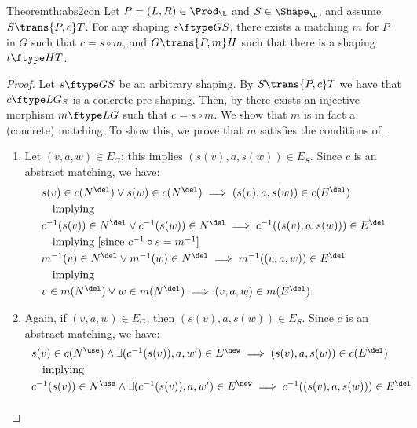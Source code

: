 \begin{oldresult}{Theorem}{th:abs2con}
  Let $P=(L,R)\in \Prod_\L$ and $S\in \Shape_\L$, and assume $S\trans{P,c} T$.
  For any shaping $s\ftype G S$, there exists a matching $m$ for $P$ in $G$ such
  that $c=s\circ m$, and $G\trans{P,m} H$ such that there is a shaping $t\ftype
  H T$.
\end{oldresult}
%
\begin{proof}
  Let $s\ftype G S$ be an arbitrary shaping.  By $S\trans{P,c}T$ we have that
  $c \ftype L {G_S}$ is a concrete pre-shaping.  Then, by  there exists an injective morphism $m \ftype L G$ such that
  $c=s \circ m$. We show that $m$ is in fact a (concrete) matching.
To show this, we  prove  that $m$ 
satisfies the conditions of .
\begin{enumerate}
\item 
Let $(v,a,w) \in E_G$; this implies $(s(v),a,s(w)) \in E_S$. Since $c$
  is an abstract matching, we have:
\[\begin{array}{l}
s(v) \in c(N^\del) \vee s(w) \in c(N^\del) \implies (s(v),a,s(w)) \in
c(E^\del)
\\[\smallskipamount]
\quad\mbox{implying}
\\[\smallskipamount]
c^{-1}(s(v)) \in N^\del \vee c^{-1}(s(w)) \in N^\del \implies c^{-1}((s(v),a,s(w))) \in
E^\del 
\\[\smallskipamount]
\quad\mbox{implying [since $c^{-1}\circ s=m^{-1}$]}
\\[\smallskipamount]
m^{-1}(v) \in N^\del \vee m^{-1}(w) \in N^\del \implies m^{-1}((v,a,w)) \in E^\del 
\\[\smallskipamount]
\quad\mbox{implying}
\\[\smallskipamount]
v \in m(N^\del) \vee w \in m(N^\del) \implies (v,a,w) \in m(E^\del). 
\end{array}\] 
%
\item Again, if  $(v,a,w) \in E_G$, then $(s(v),a,s(w)) \in E_S$. Since $c$
  is an abstract matching, we have:
\[\begin{array}{l@{}}
s(v) \in c(N^\use) \wedge \exists (c^{-1}(s(v)), a,w') \in E^\new \implies
(s(v),a,s(w)) \in c(E^\del) 
\\[\smallskipamount]
\quad\mbox{implying}
\\[\smallskipamount]
c^{-1}(s(v)) \in N^\use \wedge \exists (c^{-1}(s(v)), a,w') \in E^\new \implies
c^{-1}((s(v),a,s(w))) \in E^\del
\\ [\smallskipamount]

\end{array}\]
\end{enumerate}
\end{proof}
